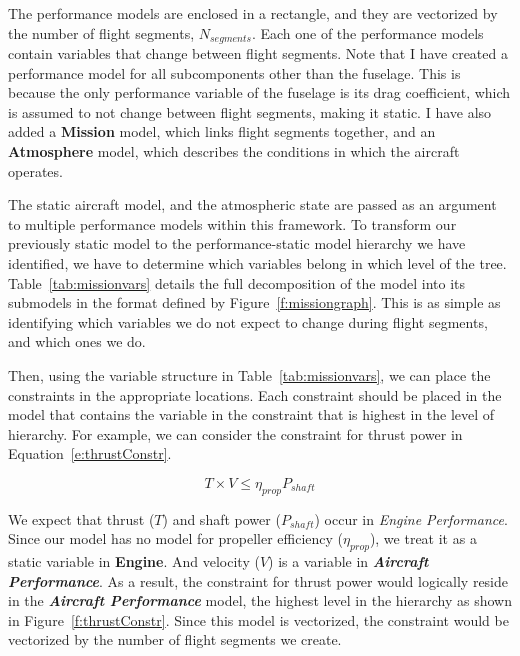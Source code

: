 The performance models are enclosed in a rectangle, and they are
vectorized by the number of flight segments, $N_{segments}$. Each
one of the performance models contain variables that change between flight segments.
Note that I have created a performance model for all subcomponents other than the
fuselage. This is because the only performance variable of the fuselage is its drag
coefficient, which is assumed to not change between flight segments, making it static. I
have also added a \textbf{Mission} model, which links flight segments together,
and an \textbf{Atmosphere} model, which describes the conditions in which the aircraft
operates.

The static aircraft model, and the atmospheric state are passed as an argument to multiple
performance models within this framework. To transform our previously static model to
the performance-static model hierarchy we have identified,
we have to determine which variables
belong in which level of the tree. Table~\ref{tab:missionvars} details the full
decomposition of the model into its submodels in the format defined
by Figure~\ref{f:missiongraph}. This is as simple as identifying which variables
we do not expect to change during flight segments, and which ones we do.

\begin{center}
    
    \label{tab:missionvars}
\end{center}

Then, using the variable structure in Table~\ref{tab:missionvars}, we can place the
constraints in the appropriate locations. Each constraint should be placed
in the model that contains the variable in the constraint that is highest in the level of hierarchy. For example,
we can consider the constraint for thrust power in Equation~\ref{e:thrustConstr}.

\begin{equation}
    \label{e:thrustConstr}
    T \times V \leq \eta_{prop} P_{shaft}
\end{equation}

We expect that thrust ($T$) and shaft power ($P_{shaft}$) occur
in \textit{Engine Performance}. Since our model has no model for propeller efficiency ($\eta_{prop}$), we treat it
as a static variable in \textbf{Engine}. And velocity ($V$) is a variable in \textbf{\textit{Aircraft {Performance}}}.
As a result, the constraint for thrust power would logically reside in the \textbf{\textit{Aircraft {Performance}}}
model, the highest level in the hierarchy as shown in Figure~\ref{f:thrustConstr}. Since this model is vectorized,
the constraint would be vectorized by the number of flight segments we create.


